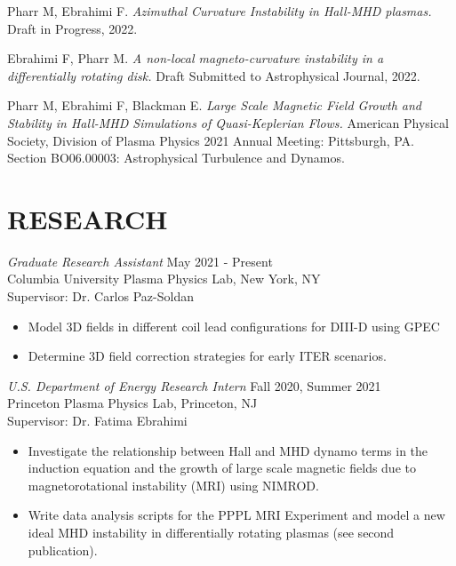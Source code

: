 \documentclass[margin]{rpires}
\begin{document}
\begin{resume}


Pharr M, Ebrahimi F. {\sl Azimuthal Curvature Instability in Hall-MHD plasmas.} Draft in Progress, 2022.
    
Ebrahimi F, Pharr M. {\sl A non-local magneto-curvature instability in a differentially rotating disk.} Draft Submitted to Astrophysical Journal, 2022.
    
Pharr M, Ebrahimi F, Blackman E. {\sl Large Scale Magnetic Field Growth and Stability in Hall-MHD Simulations of Quasi-Keplerian Flows.} American Physical Society, Division of Plasma Physics 2021 Annual Meeting: Pittsburgh, PA. Section BO06.00003: Astrophysical Turbulence and Dynamos.


\section{RESEARCH}
    {\sl Graduate Research Assistant} \hfill May 2021 - Present \\
    Columbia University Plasma Physics Lab, 
    New York, NY\\ 
    Supervisor: Dr. Carlos Paz-Soldan
    \begin{itemize}  \itemsep -2pt %
    \item Model 3D fields in different coil lead configurations for DIII-D using GPEC
    \item Determine 3D field correction strategies for early ITER scenarios.
    \end{itemize}

    {\sl U.S. Department of Energy Research Intern} \hfill Fall 2020, Summer 2021 \\
    Princeton Plasma Physics Lab, 
    Princeton, NJ\\ 
    Supervisor: Dr. Fatima Ebrahimi
    \begin{itemize}  \itemsep -2pt %
    \item Investigate the relationship between Hall and MHD dynamo terms in the induction equation and the growth of large scale magnetic fields due to magnetorotational instability (MRI) using NIMROD.
    \item Write data analysis scripts for the PPPL MRI Experiment and model a new ideal MHD instability in differentially rotating plasmas (see second publication).
    \end{itemize}


\end{resume}
\end{document}
